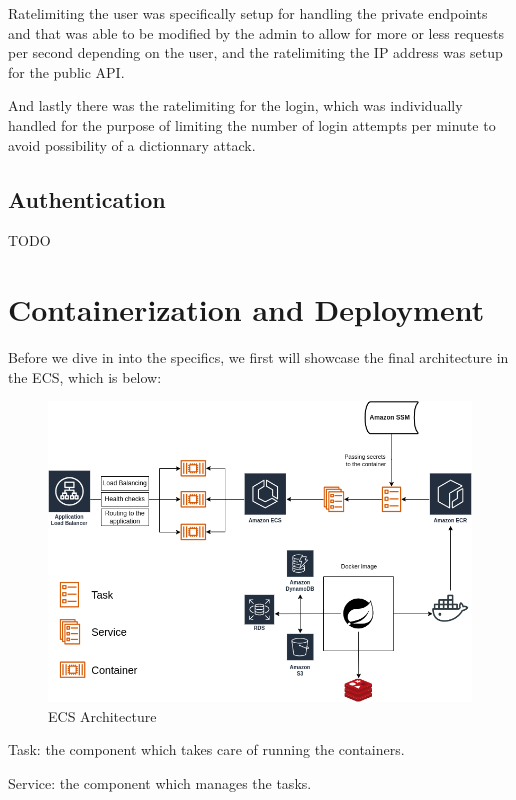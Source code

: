 Ratelimiting the user was specifically setup for handling the private endpoints and that
was able to be modified by the admin to allow for more or less requests per second
depending on the user, and the ratelimiting the IP address was setup for the public API.

And lastly there was the ratelimiting for the login, which was individually handled for
the purpose of limiting the number of login attempts per minute to avoid possibility
of a dictionnary attack.

\subsection {Authentication}

TODO

\newpage

\section {Containerization and Deployment}

Before we dive in into the specifics, we first will showcase the final architecture in the ECS, which is below:

\begin{figure}[!htbp]
    \centering
    \includegraphics[width=\textwidth]{images/ECS}
    \caption{\footnotesize{ECS Architecture}}
    \label{fig:ECSArch}
\end{figure}

Task: the component which takes care of running the containers.

Service: the component which manages the tasks.

